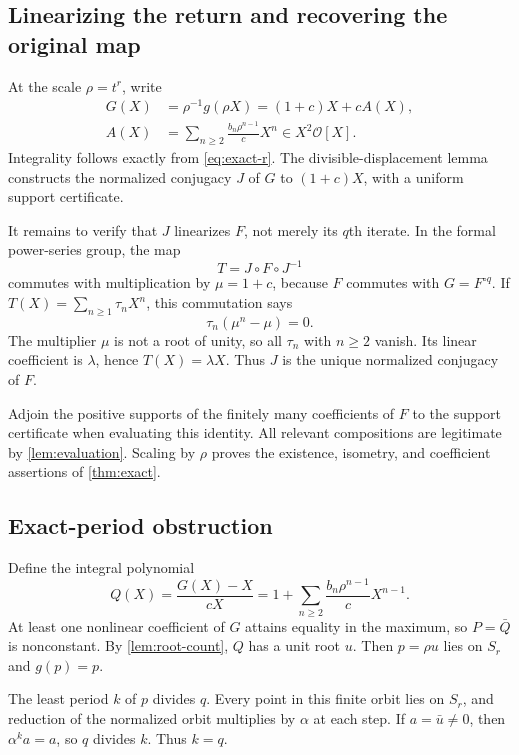 \documentclass[11pt,letterpaper]{article}
\numberwithin{equation}{section}
\theoremstyle{plain}
\theoremstyle{definition}
\theoremstyle{remark}
\newcommand{\OO}{\mathcal O}
\begin{document}
\subsection{Linearizing the return and recovering the original map}

At the scale $\rho=t^r$, write
\begin{align}
 G(X)&=\rho^{-1}g(\rho X)=(1+c)X+cA(X),\label{eq:G}\\
 A(X)&=\sum_{n\ge2}\frac{b_n\rho^{n-1}}{c}X^n\in X^2\OO[X].\label{eq:A}
\end{align}
Integrality follows exactly from \eqref{eq:exact-r}. The divisible-displacement
lemma constructs the normalized conjugacy $J$ of $G$ to $(1+c)X$, with a
uniform support certificate.

It remains to verify that $J$ linearizes $F$, not merely its $q$th iterate.
In the formal power-series group, the map
\[
 T=J\circ F\circ J^{-1}
\]
commutes with multiplication by $\mu=1+c$, because $F$ commutes with
$G=F^{\circ q}$. If $T(X)=\sum_{n\ge1}\tau_nX^n$, this commutation says
\[
 \tau_n(\mu^n-\mu)=0.
\]
The multiplier $\mu$ is not a root of unity, so all $\tau_n$ with $n\ge2$
vanish. Its linear coefficient is $\lambda$, hence $T(X)=\lambda X$.
Thus $J$ is the unique normalized conjugacy of $F$.

Adjoin the positive supports of the finitely many coefficients of $F$ to the
support certificate when evaluating this identity. All relevant compositions
are legitimate by \cref{lem:evaluation}. Scaling by $\rho$ proves the
existence, isometry, and coefficient assertions of \cref{thm:exact}.

\subsection{Exact-period obstruction}

Define the integral polynomial
\begin{equation}\label{eq:Q-shell}
 Q(X)=\frac{G(X)-X}{cX}
     =1+\sum_{n\ge2}\frac{b_n\rho^{n-1}}{c}X^{n-1}.
\end{equation}
At least one nonlinear coefficient of $G$ attains equality in the maximum,
so $P=\bar Q$ is nonconstant. By \cref{lem:root-count}, $Q$ has a unit
root $u$. Then $p=\rho u$ lies on $S_r$ and $g(p)=p$.

The least period $k$ of $p$ divides $q$. Every point in this finite orbit
lies on $S_r$, and reduction of the normalized orbit multiplies by
$\alpha$ at each step. If $a=\bar u\ne0$, then
$\alpha^ka=a$, so $q$ divides $k$. Thus $k=q$.
\end{document}
